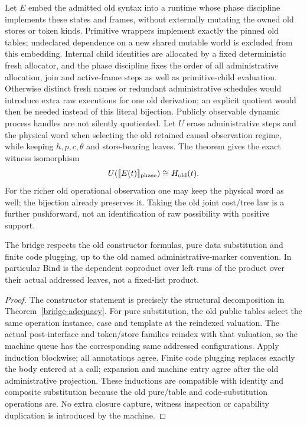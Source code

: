 \documentclass[11pt]{article}
\begin{document}
Let $E$ embed the admitted old syntax into a runtime whose phase discipline implements these states and frames, without externally mutating the owned old stores or token kinds. Primitive wrappers implement exactly the pinned old tables; undeclared dependence on a new shared mutable world is excluded from this embedding. Internal child identities are allocated by a fixed deterministic fresh allocator, and the phase discipline fixes the order of all administrative allocation, join and active-frame steps as well as primitive-child evaluation. Otherwise distinct fresh names or redundant administrative schedules would introduce extra raw executions for one old derivation; an explicit quotient would then be needed instead of this literal bijection. Publicly observable dynamic process handles are not silently quotiented. Let $U$ erase administrative steps and the physical word when selecting the old retained causal observation regime, while keeping $h,p,c,\theta$ and store-bearing leaves. The theorem gives the exact witness isomorphism
\[
 U(\llbracket E(t)\rrbracket_{\rm phase})\cong H_{\rm old}(t).
\]
For the richer old operational observation one may keep the physical word as well; the bijection already preserves it. Taking the old joint cost/tree law is a further pushforward, not an identification of raw possibility with positive support.

\begin{proposition}
The bridge respects the old constructor formulas, pure data substitution and finite code plugging, up to the old named administrative-marker convention. In particular Bind is the dependent coproduct over left runs of the product over their actual addressed leaves, not a fixed-list product.
\end{proposition}
\begin{proof}
The constructor statement is precisely the structural decomposition in Theorem~\ref{bridge-adequacy}. For pure substitution, the old public tables select the same operation instance, case and template at the reindexed valuation. The actual post-interface and token/store families reindex with that valuation, so the machine queue has the corresponding same addressed configurations. Apply induction blockwise; all annotations agree. Finite code plugging replaces exactly the body entered at a call; expansion and machine entry agree after the old administrative projection. These inductions are compatible with identity and composite substitution because the old pure/table and code-substitution operations are. No extra closure capture, witness inspection or capability duplication is introduced by the machine.
\end{proof}
\end{document}
